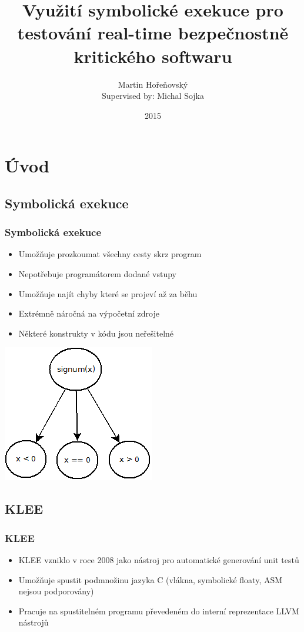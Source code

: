 \documentclass{beamer}
\author[Martin Hořeňovský]{Martin Hořeňovský\\{\small Supervised by: Michal Sojka}}
\title{Využití symbolické exekuce pro testování real-time bezpečnostně
kritického softwaru}
\institute{FEL ČVUT}
\date{2015}
\begin{document}
\begin{frame}
\titlepage
\end{frame}


\section{Úvod}
\subsection*{Symbolická exekuce}
\begin{frame}
\frametitle{Symbolická exekuce}
\begin{itemize}
    \item Umožňuje prozkoumat všechny cesty skrz program
    \item Nepotřebuje programátorem dodané vstupy
    \item Umožňuje najít chyby které se projeví až za běhu
    \item Extrémně náročná na výpočetní zdroje
    \item Některé konstrukty v kódu jsou neřešitelné
\end{itemize}
\begin{center}
\includegraphics[scale=0.5]{symb-exec.png}
\end{center}
\end{frame}

\subsection*{KLEE}
\begin{frame}
\frametitle{KLEE}
\begin{itemize}
    \item KLEE vzniklo v roce 2008 jako nástroj pro automatické generování
    unit testů
    \item Umožňuje spustit podmnožinu jazyka C (vlákna, symbolické floaty, ASM nejsou podporovány)
    \item Pracuje na spustitelném programu převedeném do interní reprezentace LLVM nástrojů
\end{itemize}
\end{frame}
\end{document}
